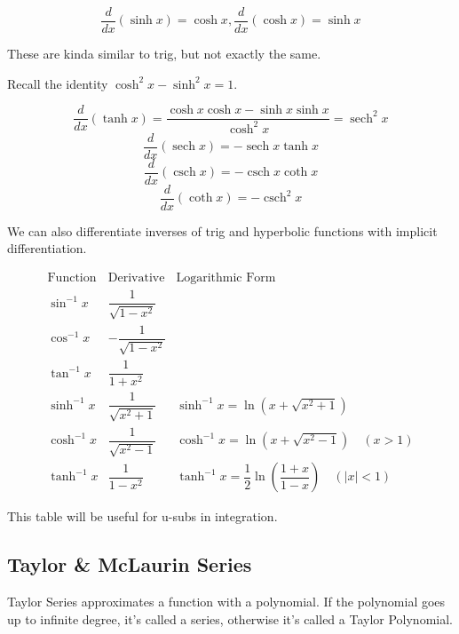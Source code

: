 \documentclass{article}
\newcommand{\f}[2]{\frac{#1}{#2}}
\DeclareMathOperator{\sech}{sech}
\DeclareMathOperator{\csch}{csch}
\newcommand{\ddx}{\frac{d}{dx}}
\newcommand{\artanh}{\tanh^{-1}}
\newcommand{\arsinh}{\sinh^{-1}}
\newcommand{\arcosh}{\cosh^{-1}}
\theoremstyle{mytheoremstyle}
\theoremstyle{mytheoremstyle}
\theoremstyle{myproblemstyle}
\theoremstyle{myproblemstyle}
\begin{document}
    \begin{theorem}
        \[\f{d}{dx}(\sinh{x}) = \cosh{x}, \f{d}{dx}(\cosh{x}) = \sinh{x}\]
    \end{theorem}

    These are kinda similar to trig, but not exactly the same.

    Recall the identity $\cosh^2{x} - \sinh^2{x} = 1$. 

    \vspace{10pt}
    \begin{theorem}
        \[\f{d}{dx}(\tanh{x}) = \f{\cosh{x}\cosh{x} - \sinh{x}\sinh{x}}{\cosh^2{x}} = \sech^2{x}\]
        \[\ddx (\sech{x}) = -\sech{x}\tanh{x}\]
        \[\ddx (\csch{x}) = -\csch{x}\coth{x}\]
        \[\ddx (\coth{x}) = -\csch^2{x}\]
    \end{theorem}

    We can also differentiate inverses of trig and hyperbolic functions with implicit differentiation.


    \[
    \begin{array}{c|c|c}
    \text{Function} & \text{Derivative} & \text{Logarithmic Form} \\ \hline

    \sin^{-1} x & \dfrac{1}{\sqrt{1 - x^2}} & \\[1.2em]

    \cos^{-1} x & -\dfrac{1}{\sqrt{1 - x^2}} & \\[1.2em]

    \tan^{-1} x & \dfrac{1}{1 + x^2} & \\[1.2em]

    \arsinh{x} & \dfrac{1}{\sqrt{x^2 + 1}} 
    & \arsinh{x} = \ln\!\left(x + \sqrt{x^2 + 1}\right) \\[1.2em]

    \arcosh{x} & \dfrac{1}{\sqrt{x^2 - 1}} 
    & \arcosh{x} = \ln\!\left(x + \sqrt{x^2 - 1}\right) \quad (x > 1) \\[1.2em]

    \artanh{x} & \dfrac{1}{1 - x^2} 
    & \artanh{x} = \dfrac12 \ln\!\left(\dfrac{1 + x}{1 - x}\right) \quad (|x| < 1)
    \end{array}
    \]

    This table will be useful for u-subs in integration.



    \subsection{Taylor \& McLaurin Series}
    Taylor Series approximates a function with a polynomial. If the polynomial goes up to infinite degree, it's called a series, otherwise it's called a Taylor Polynomial.
\end{document}
